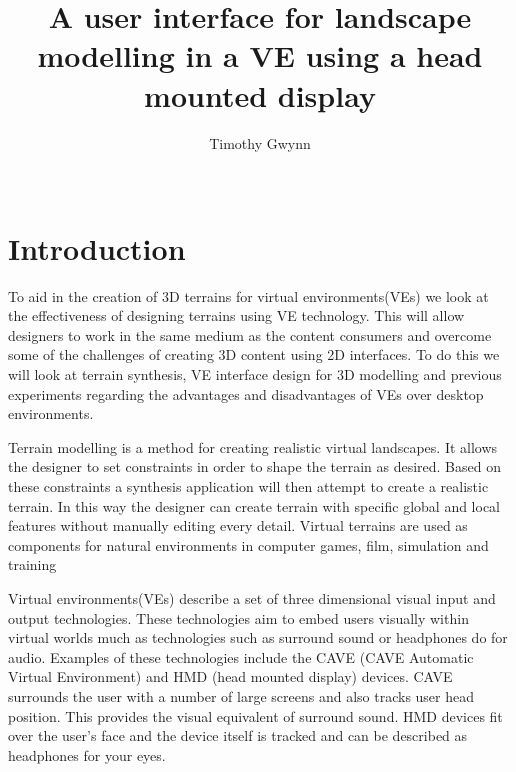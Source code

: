 \documentclass{sig-alternate-05-2015}
\begin{document}
\title{A user interface for landscape modelling in a VE using a head mounted display}

\author{
\alignauthor
Timothy Gwynn\\
       \\
}
\maketitle
\begin{CCSXML}

\end{CCSXML}



\printccsdesc
{}

\section{Introduction}
To aid in the creation of 3D terrains for virtual environments(VEs) we look at the effectiveness of designing terrains using VE technology. This will allow designers to work in the same medium as the content consumers and overcome some of the challenges of creating 3D content using 2D interfaces. To do this we will look at terrain synthesis, VE interface design for 3D modelling and previous experiments regarding the advantages and disadvantages of VEs over desktop environments.

Terrain modelling is a method for creating realistic virtual landscapes. It allows the designer to set constraints in order to shape the terrain as desired. Based on these constraints a synthesis application will then attempt to create a realistic terrain. In this way the designer can create terrain with specific global and local features without manually editing every detail. Virtual terrains are used as components for natural environments in computer games, film, simulation and training\cite{Gain2015}

Virtual environments(VEs) describe a set of three dimensional visual input and output technologies. These technologies aim to embed users visually within virtual worlds much as technologies such as surround sound or headphones do for audio. Examples of these technologies include the CAVE (CAVE Automatic Virtual
Environment) and HMD (head mounted display) devices.
CAVE surrounds the user with a number of large screens and also tracks user head position\cite{Cruz-Neira1993}. This provides the visual equivalent of surround sound. HMD devices fit over the user's face and the device itself is tracked and can be described as headphones for your eyes.\cite{alger2015visual}
\end{document}
